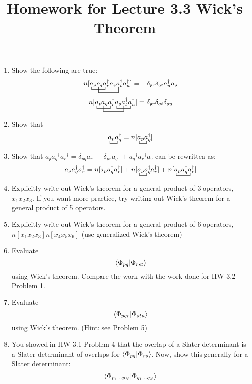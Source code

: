 \documentclass{article}
\title{Homework for Lecture 3.3 Wick's Theorem}
\date{}
\newcommand{\dg}{\ensuremath{^\dagger} }
\newcommand{\cd}{\ensuremath{\cdots} }
\begin{document}
\maketitle
\noindent
\begin{enumerate}
\item Show the following are true: 
 \[ \bcontraction{n[}{a}{{}_p a_q}{a}
\bcontraction[2ex]{n[a_p }{a}{{}_q a_r\dg a_s }{a}
n[a_p a_q a_r\dg a_s a_t\dg a_u\dg]  = -\delta_{pr}\delta_{qt} a_u\dg a_s\] 
 \[ \bcontraction{n[}{a}{{}_p a_q}{a}
\bcontraction[2ex]{n[a_p }{a}{{}_q a_r\dg a_s }{a}
\bcontraction{n[a_p a_q a_r\dg }{a}{{}_s a_t\dg }{a}
n[a_p a_q a_r\dg a_s a_t\dg a_u\dg]  = \delta_{pr}\delta_{qt} \delta_{su}\] 

\item Show that
\[\bcontraction{}{a}{{}_p}{a}a_p a_q\dg = n[\bcontraction{}{a}{{}_p}{a}a_p a_q\dg]\]


\item Show that $a_p a_q\dg a_r\dg  = \delta_{pq}a_r\dg - \delta_{pr} a_q\dg +  a_q\dg a_r\dg a_p$ can be rewritten as:
\[a_p a_q\dg a_r\dg  = n[a_p a_q\dg a_r\dg ] + n[\bcontraction{}{a}{{}_p}{a} a_p a_q\dg a_r\dg ]  + n[\bcontraction{}{a}{{}_p a_q\dg}{a} a_p a_q\dg a_r\dg ] \]

\item Explicitly write out Wick's theorem for a general product of 3 operators, $x_1 x_2 x_3$. If you want more practice, try writing out Wick's theorem for a general product of 5 operators. 

\item Explicitly write out Wick's theorem for a general product of 6 operators,  $n[x_1 x_2 x_3]n[ x_4 x_5 x_6]$ (use generalized Wick's theorem)

 \item Evaluate \[\braket{\Phi_{pq} | \Phi_{rst}} \] using Wick's theorem.
 Compare the work with the work done for HW 3.2 Problem 1. 
 
  \item Evaluate \[\braket{\Phi_{pqr} | \Phi_{stu}} \] using Wick's theorem.
(Hint: see Problem 5)
 
 \item You showed in HW 3.1 Problem 4 that the overlap of a Slater determinant is a Slater determinant of overlaps for $\braket{\Phi_{pq} | \Phi_{rs}}$.
 Now, show this generally for a Slater determinant:
 \[\braket{\Phi_{p_1 \cd p_N} | \Phi_{q_1 \cd q_N}} \]
 

\end{enumerate}
\end{document}
